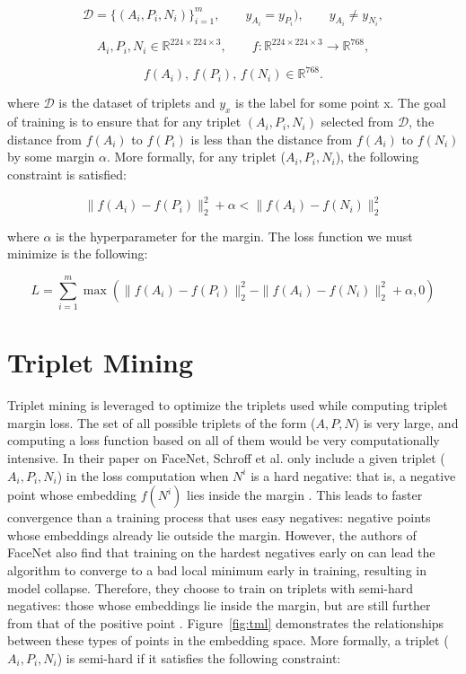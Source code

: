 \documentclass[remotesensing,article,submit,moreauthors]{Definitions/mdpi}
\begin{document}
\[
\mathcal{D} = \{(A_i, P_i, N_i)\}_{i=1}^m,\qquad
y_{A_i} = y_{P_i}),\qquad y_{A_i} \neq y_{N_i},
\]

\[
A_i, P_i, N_i \in \mathbb{R}^{224 \times 224 \times 3}, \qquad
f : \mathbb{R}^{224 \times 224 \times 3} \to \mathbb{R}^{768},
\]

\[
f(A_i),\, f(P_i),\, f(N_i) \in \mathbb{R}^{768}.
\]

where $\mathcal{D}$ is the dataset of triplets and $y_x$ is the label for some point x. The goal of training is to ensure that for any triplet $(A_i, P_i, N_i)$ selected from $\mathcal{D}$, the distance from $f(A_i)$ to $f(P_i)$ is less than the distance from $f(A_i)$ to $f(N_i)$ by some margin $\alpha$. More formally, for any triplet ($A_i, P_i, N_i$), the following constraint is satisfied: 

$$
\|f(A_i) - f(P_i)\|_2^2 + \alpha < \|f(A_i) - f(N_i)\|_2^2
$$

where $\alpha$ is the hyperparameter for the margin. The loss function we must minimize is the following: 

$$
L = \sum_{i=1}^{m} \max \left( \|f(A_i) - f(P_i)\|_2^2 - \|f(A_i) - f(N_i)\|_2^2 + \alpha, 0 \right)
$$

\section{Triplet Mining}
\label{app:mining}

Triplet mining is leveraged to optimize the triplets used while computing triplet margin loss. The set of all possible triplets of the form ($A, P, N$) is very large, and computing a loss function based on all of them would be very computationally intensive. In their paper on FaceNet, Schroff et al. only include a given triplet ($A_i, P_i, N_i$) in the loss computation when $N^i$ is a hard negative: that is, a negative point whose embedding $f(N^i)$ lies inside the margin \cite{Schroff_2015_CVPR}. This leads to faster convergence than a training process that uses easy negatives: negative points whose embeddings already lie outside the margin. However, the authors of FaceNet also find that training on the hardest negatives early on can lead the algorithm to converge to a bad local minimum early in training, resulting in model collapse. Therefore, they choose to train on triplets with semi-hard negatives: those whose embeddings lie inside the margin, but are still further from that of the positive point \cite{Schroff_2015_CVPR}. Figure~\ref{fig:tml} demonstrates the relationships between these types of points in the embedding space. More formally, a triplet ($A_i, P_i, N_i$) is semi-hard if it satisfies the following constraint: 
\end{document}
